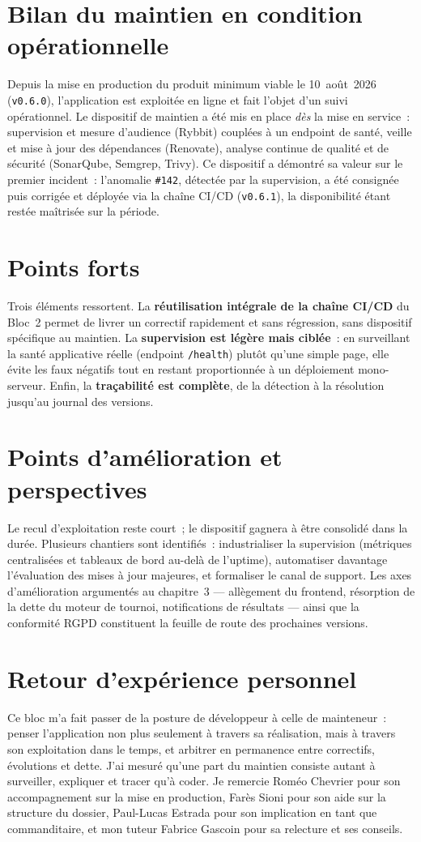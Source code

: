 \section*{Bilan du maintien en condition opérationnelle}
Depuis la mise en production du produit minimum viable le 10~août~2026 (\texttt{v0.6.0}), l'application est exploitée en ligne et fait l'objet d'un suivi opérationnel. Le dispositif de maintien a été mis en place \emph{dès} la mise en service~: supervision et mesure d'audience (Rybbit) couplées à un endpoint de santé, veille et mise à jour des dépendances (Renovate), analyse continue de qualité et de sécurité (SonarQube, Semgrep, Trivy). Ce dispositif a démontré sa valeur sur le premier incident~: l'anomalie \texttt{\#142}, détectée par la supervision, a été consignée puis corrigée et déployée via la chaîne CI/CD (\texttt{v0.6.1}), la disponibilité étant restée maîtrisée sur la période.

\section*{Points forts}
Trois éléments ressortent. La \textbf{réutilisation intégrale de la chaîne CI/CD} du Bloc~2 permet de livrer un correctif rapidement et sans régression, sans dispositif spécifique au maintien. La \textbf{supervision est légère mais ciblée}~: en surveillant la santé applicative réelle (endpoint \texttt{/health}) plutôt qu'une simple page, elle évite les faux négatifs tout en restant proportionnée à un déploiement mono-serveur. Enfin, la \textbf{traçabilité est complète}, de la détection à la résolution jusqu'au journal des versions.

\section*{Points d'amélioration et perspectives}
Le recul d'exploitation reste court~; le dispositif gagnera à être consolidé dans la durée. Plusieurs chantiers sont identifiés~: industrialiser la supervision (métriques centralisées et tableaux de bord au-delà de l'uptime), automatiser davantage l'évaluation des mises à jour majeures, et formaliser le canal de support. Les axes d'amélioration argumentés au chapitre~3 — allègement du frontend, résorption de la dette du moteur de tournoi, notifications de résultats — ainsi que la conformité RGPD constituent la feuille de route des prochaines versions.

\section*{Retour d'expérience personnel}
Ce bloc m'a fait passer de la posture de développeur à celle de mainteneur~: penser l'application non plus seulement à travers sa réalisation, mais à travers son exploitation dans le temps, et arbitrer en permanence entre correctifs, évolutions et dette. J'ai mesuré qu'une part du maintien consiste autant à surveiller, expliquer et tracer qu'à coder. Je remercie Roméo Chevrier pour son accompagnement sur la mise en production, Farès Sioni pour son aide sur la structure du dossier, Paul-Lucas Estrada pour son implication en tant que commanditaire, et mon tuteur Fabrice Gascoin pour sa relecture et ses conseils.

